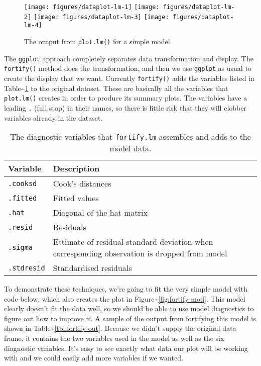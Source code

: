 \begin{figure}
\texttt{[image: figures/dataplot-lm-1]} \texttt{[image: figures/dataplot-lm-2]} \texttt{[image: figures/dataplot-lm-3]} \texttt{[image: figures/dataplot-lm-4]} \caption{The output from \texttt{plot.lm()} for a simple model.\label{fig:plot-lm}}
\end{figure}

The \texttt{ggplot} approach completely separates data transformation
and display. The \texttt{fortify()} method does the transformation, and
then we use \texttt{ggplot} as usual to create the display that we want.
Currently \texttt{fortify()} adds the variables listed in
Table\textasciitilde{}\ref{tbl:fortify-vars} to the original dataset.
These are basically all the variables that \texttt{plot.lm()} creates in
order to produce its summary plots. The variables have a leading
\texttt{.} (full stop) in their names, so there is little risk that they
will clobber variables already in the dataset.

\begin{table}
  \centering
  \begin{tabular}{lp{2.5in}}
    \toprule
    Variable & Description \\
    \midrule
    \texttt{.cooksd}   & Cook's distances \\
    \texttt{.fitted}   & Fitted values \\
    \texttt{.hat}      & Diagonal of the hat matrix \\
    \texttt{.resid}    & Residuals \\
    \texttt{.sigma}    & Estimate of residual standard deviation when corresponding observation is dropped from model \\
    \texttt{.stdresid} & Standardised residuals \\
    \bottomrule
  \end{tabular}
  \caption{The diagnostic variables that \texttt{fortify.lm} assembles and adds to the model data.}
  \label{tbl:fortify-vars}
\end{table}

To demonstrate these techniques, we're going to fit the very simple
model with code below, which also creates the plot in
Figure\textasciitilde{}\ref{fig:fortify-mod}. This model clearly doesn't
fit the data well, so we should be able to use model diagnostics to
figure out how to improve it. A sample of the output from fortifying
this model is shown in Table\textasciitilde{}\ref{tbl:fortify-out}.
Because we didn't supply the original data frame, it contains the two
variables used in the model as well as the six diagnostic variables.
It's easy to see exactly what data our plot will be working with and we
could easily add more variables if we wanted.

